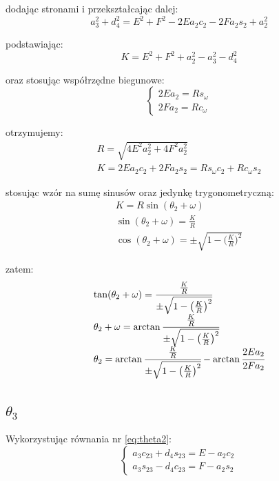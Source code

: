 \documentclass[]{article}
\begin{document}
dodając stronami i przekształcając dalej:
\begin{equation}
a_3^2 + d_4^2 = E^2 + F^2 - 2Ea_2c_2 - 2Fa_2s_2 + a_2^2
\end{equation}

podstawiając:
\begin{equation}
K = E^2 + F^2 + a_2^2 - a_3^2 - d_4^2
\end{equation}

oraz stosując współrzędne biegunowe:
\begin{equation}\left\{\begin{array}{l}
2Ea_2 = Rs_\omega \\
2Fa_2 = Rc_\omega
\end{array}\right.\end{equation}

otrzymujemy:
\begin{equation}\begin{array}{l}
R = \sqrt{4E^2a_2^2 + 4F^2a_2^2} \\
K = 2Ea_2c_2 + 2Fa_2s_2 = Rs_\omega c_2 + Rc_\omega s_2
\end{array}\end{equation}

stosując wzór na sumę sinusów oraz jedynkę trygonometryczną:
\begin{equation}\begin{array}{l}
K = R\sin(\theta_2 + \omega) \\
\sin(\theta_2 + \omega) = \frac{K}{R} \\
\cos(\theta_2 + \omega) = \pm \sqrt{1 - \big(\frac{K}{R}\big)^2}
\end{array}\end{equation}

zatem:
\begin{equation}\begin{array}{l}
\tan(\theta_2 + \omega) = \cfrac{\frac{K}{R}}{\pm \sqrt{1 - \big(\frac{K}{R}\big)^2}} \\
\theta_2 + \omega = \arctan{\cfrac{\frac{K}{R}}{\pm \sqrt{1 - \big(\frac{K}{R}\big)^2}}} \\
\theta_2  = \arctan{\cfrac{\frac{K}{R}}{\pm \sqrt{1 - \big(\frac{K}{R}\big)^2}}} - \arctan{\cfrac{2Ea_2}{2Fa_2}} \\
\end{array}\end{equation}

\subsection{$\theta_3$}
Wykorzystując równania nr \ref{eq:theta2}:
\begin{equation}\left\{\begin{array}{l}
a_3c_{23} + d_4s_{23} = E - a_2c_2 \\
a_3s_{23} - d_4c_{23} = F - a_2s_2
\end{array}\right.\end{equation}
\end{document}
